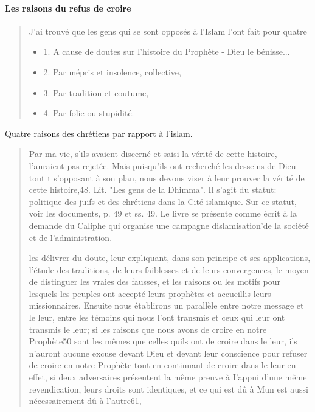 \paragraph{Les raisons du refus de croire}


\begin{quote}
 
J'ai trouvé que les gens qui se sont opposés à l'Islam l'ont fait pour quatre 
\begin{itemize}
    \item 1. A cause de doutes sur l'histoire du Prophète - Dieu le bénisse...
    \item 2. Par mépris et insolence, collective,
    \item 3. Par tradition et coutume,
    \item 4. Par folie ou stupidité.
\end{itemize}
\end{quote}
Quatre raisons des chrétiens par rapport à l'islam.

\begin{quote}
    
Par ma vie, s'ils avaient discerné et saisi la vérité de cette histoire, l'auraient pas rejetée. Mais puisqu'ils ont recherché les desseins de Dieu tout t s'opposant à son plan, nous devons viser à leur prouver la vérité de cette histoire,48. Lit. "Les gens de la Dhimma". Il s'agit du statut: politique des juifs et des chrétiens dans la Cité islamique. Sur ce statut, voir les documents, p. 49 et ss.
49. Le livre se présente comme écrit à la demande du Caliphe qui organise une campagne dislamisation'de la société et de l'administration.

les délivrer du doute, leur expliquant, dans son principe et ses applications, l'étude des traditions, de leurs faiblesses et de leurs convergences, le moyen de distinguer les vraies des fausses, et les raisons ou les motifs pour lesquels les peuples ont accepté leurs prophètes et accueillis leurs missionnaires.
Ensuite nous établirons un parallèle entre notre message et le leur, entre les témoins qui nous l'ont transmis et ceux qui leur ont transmis le leur; si les raisons que nous avons de croire en notre Prophète50 sont les mêmes que celles quils ont de croire dans le leur, ils n'auront aucune excuse devant Dieu et devant leur conscience pour refuser de croire en notre Prophète tout en continuant de croire dans le leur en effet, si deux adversaires présentent la même preuve à I'appui d'une même revendication, leurs droits sont identiques, et ce qui est dû à Mun est aussi nécessairement dû à l'autre61,
\end{quote}

 


